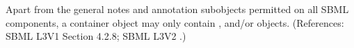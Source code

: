Apart from the general notes and annotation subobjects permitted on all
SBML components, a \ListOfRules container object may only contain
\AssignmentRule, \AlgebraicRule and/or \RateRule objects.  (References:
SBML L3V1 Section 4.2.8; SBML L3V2 .)

